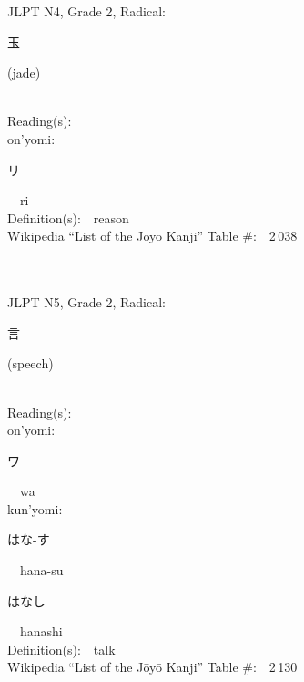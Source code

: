 \begin{multicols}{2}
{JLPT N4, Grade 2, Radical:\ \ {\begin{CJK}{UTF8}{min} 玉 \end{CJK}} (jade) } \\
Reading(s):\ \ \\
{\hspace*{1em}}on'yomi:\ \ \\
{\hspace*{2em}}{\begin{CJK}{UTF8}{min} リ \end{CJK}}\ \ ri\ \ \\
Definition(s):\ \ reason \\
Wikipedia ``List of the J\=oy\=o Kanji'' Table \#:\ \ 2\,038 \\
\ \ \\
{\fontsize{34pt}{40pt}  }\ \ \\  %
{JLPT N5, Grade 2, Radical:\ \ {\begin{CJK}{UTF8}{min} 言 \end{CJK}} (speech) } \\
Reading(s):\ \ \\
{\hspace*{1em}}on'yomi:\ \ \\
{\hspace*{2em}}{\begin{CJK}{UTF8}{min} ワ \end{CJK}}\ \ wa\ \ \\
{\hspace*{1em}}kun'yomi:\ \ \\
{\hspace*{2em}}{\begin{CJK}{UTF8}{min} はな-す \end{CJK}}\ \ hana-su\ \ \\
{\hspace*{2em}}{\begin{CJK}{UTF8}{min} はなし \end{CJK}}\ \ hanashi\ \ \\
Definition(s):\ \ talk \\
Wikipedia ``List of the J\=oy\=o Kanji'' Table \#:\ \ 2\,130 \\
\ \ \\
\end{multicols}

\newpage


